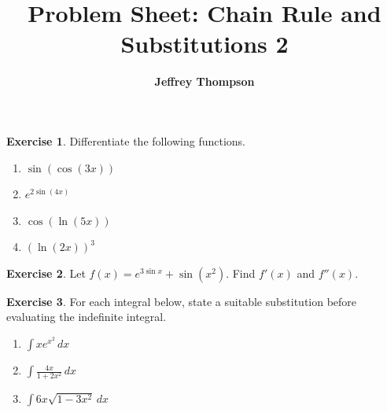 \documentclass[a4paper]{article}
\theoremstyle{plain}
\theoremstyle{definition}
\newtheorem{exercise}{Exercise}
\numberwithin{equation}{subsection}
\begin{document}
\title{\textbf{Problem Sheet: Chain Rule and Substitutions 2}}
\author{\textbf{Jeffrey Thompson}}
\maketitle

\begin{exercise}
Differentiate the following functions.
\begin{enumerate}
    \item $\sin(\cos(3x))$
    \item $e^{2\sin(4x)}$
    \item $\cos(\ln(5x))$
    \item $(\ln(2x))^3$
\end{enumerate}
\end{exercise}

\begin{exercise}
Let $f(x)=e^{3\sin x} + \sin(x^2)$. Find $f'(x)$ and $f''(x)$.
\end{exercise}

\begin{exercise}
For each integral below, state a suitable substitution before evaluating the indefinite integral.
\begin{enumerate}
    \item $\displaystyle \int x e^{x^2}\,dx$
    \item $\displaystyle \int \frac{4x}{1+2x^2}\,dx$
    \item $\displaystyle \int 6x\sqrt{1-3x^2}\,dx$
\end{enumerate}
\end{exercise}
\end{document}
